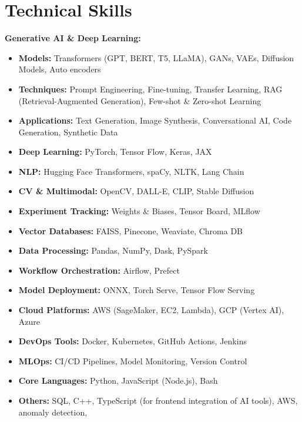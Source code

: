 \vspace{-20pt}
\section*{Technical Skills}
\vspace{-20pt}

\noindent\textbf{Generative AI \& Deep Learning:}

\begin{itemize}
  \item \textbf{Models:} Transformers (GPT, BERT, T5, LLaMA), GANs, VAEs, Diffusion Models, Auto encoders
  \item \textbf{Techniques:} Prompt Engineering, Fine-tuning, Transfer Learning, RAG (Retrieval-Augmented Generation), Few-shot \& Zero-shot Learning
  \item \textbf{Applications:} Text Generation, Image Synthesis, Conversational AI, Code Generation, Synthetic Data
  \item \textbf{Deep Learning:} PyTorch, Tensor Flow, Keras, JAX
  \item \textbf{NLP:} Hugging Face Transformers, spaCy, NLTK, Lang Chain
  \item \textbf{CV \& Multimodal:} OpenCV, DALL-E, CLIP, Stable Diffusion
  \item \textbf{Experiment Tracking:} Weights \& Biases, Tensor Board, MLflow
  \item \textbf{Vector Databases:} FAISS, Pinecone, Weaviate, Chroma DB
  \item \textbf{Data Processing:} Pandas, NumPy, Dask, PySpark
  \item \textbf{Workflow Orchestration:} Airflow, Prefect
  \item \textbf{Model Deployment:} ONNX, Torch Serve, Tensor Flow Serving
  \item \textbf{Cloud Platforms:} AWS (SageMaker, EC2, Lambda), GCP (Vertex AI), Azure
  \item \textbf{DevOps Tools:} Docker, Kubernetes, GitHub Actions, Jenkins
  \item \textbf{MLOps:} CI/CD Pipelines, Model Monitoring, Version Control
  \item \textbf{Core Languages:} Python, JavaScript (Node.js), Bash
  \item \textbf{Others:} SQL, C++, TypeScript (for frontend integration of AI tools), AWS, anomaly detection,

\end{itemize}

